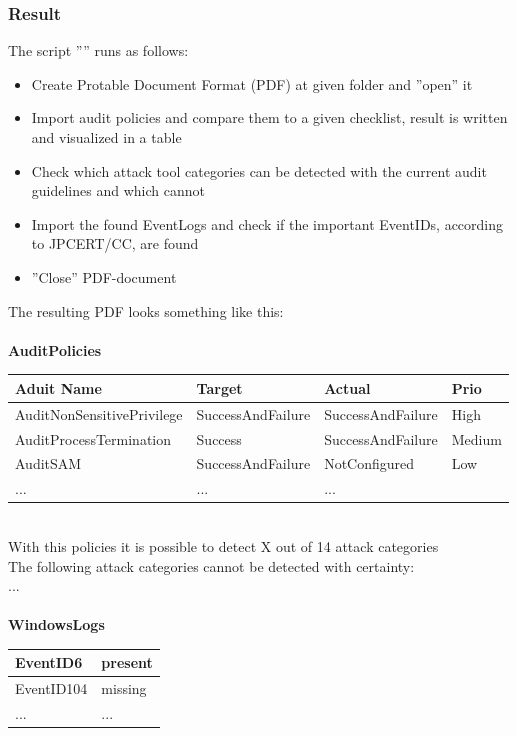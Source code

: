 \subsubsection{Result} \label{resultVisualize}
The script '''' runs as follows:
\begin{itemize}
    \item Create Protable Document Format (PDF) at given folder and ''open'' it
    \item Import audit policies and compare them to a given checklist, result is written and visualized in a table
    \item Check which attack tool categories can be detected with the current audit guidelines and which cannot
    \item Import the found EventLogs and check if the important EventIDs, according to JPCERT/CC, are found
    \item ''Close'' PDF-document
\end{itemize}
The resulting PDF looks something like this: \ \\
\ \\
\textbf{AuditPolicies}
\begin{table}[H]
    \centering
    \begin{tabular}{| p{4.5cm} |  p{4cm} | p{4cm} | p{2.5cm}|} \hline
        Aduit Name & Target & Actual & Prio\\ \hline
        AuditNonSensitivePrivilege & SuccessAndFailure &\cellcolor{green} SuccessAndFailure & High\\ \hline
        AuditProcessTermination & Success &\cellcolor{darkgreen} SuccessAndFailure & Medium \\ \hline
        AuditSAM & SuccessAndFailure &\cellcolor{red} NotConfigured & Low\\ \hline
        ... & ... & ... &\\ \hline
    \end{tabular}
\end{table}\ \\
With this policies it is possible to detect X out of 14 attack categories \ \\
The following attack categories cannot be detected with certainty: \\
... \ \\
\ \\
\textbf{WindowsLogs}
\begin{table}[H]
    \centering
    \begin{tabular}{| p{8cm} |  p{8cm} |} \hline
        EventID6 & present \\ \hline
        EventID104 & missing \\ \hline
        ... & ... \\ \hline
    \end{tabular}
\end{table}

